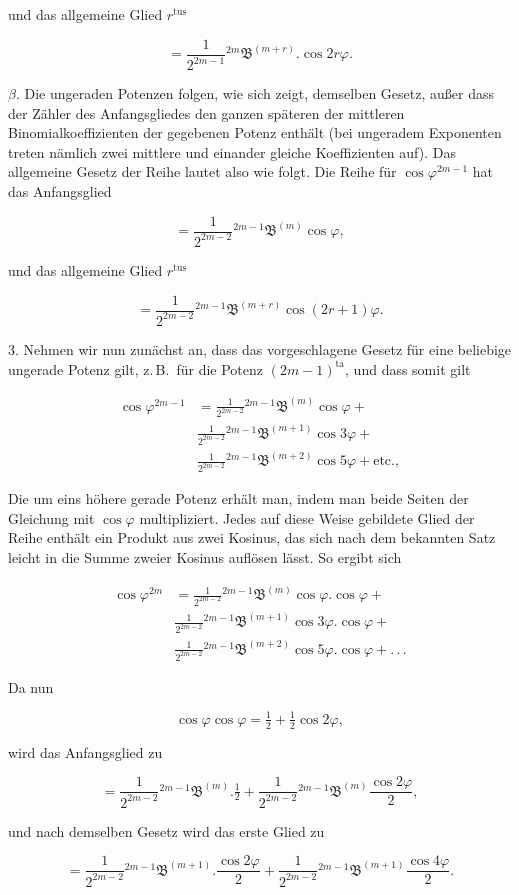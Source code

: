 \par\noindent{}%
und das allgemeine Glied $r^{\text{tus}}$

\[ = \frac{1}{2^{2m-1}}{}^{2m}\!\mathfrak{B}^{(m+r)}\! . \cos 2r\varphi. \]

$\beta$. Die ungeraden Potenzen folgen, wie sich zeigt, demselben Gesetz, außer dass
\noindent der Zähler des Anfangsgliedes den ganzen späteren der mittleren Binomialkoeffizienten der gegebenen Potenz enthält (bei ungeradem Exponenten treten nämlich zwei mittlere und einander gleiche Koeffizienten auf). Das allgemeine Gesetz der Reihe lautet also wie folgt. Die Reihe für $\cos\varphi^{2m-1}$ hat das
\noindent Anfangsglied

\[ = \frac{1}{2^{2m-2}}{}^{2m-1}\!\mathfrak{B}^{(m)}\cos\varphi, \]

\noindent und das allgemeine Glied $r^{\text{tus}}$

\[ = \frac{1}{2^{2m-2}}{}^{2m-1}\!\mathfrak{B}^{(m+r)}\cos(2r+1)\varphi. \]

3. Nehmen wir nun zunächst an, dass das vorgeschlagene Gesetz für eine beliebige ungerade Potenz gilt, z.\,B.\ für die Potenz $(2m-1)^{\text{ta}}$, und dass somit gilt

\[
\begin{aligned}
\cos\varphi^{2m-1} & = \frac{1}{2^{2m-2}}{}^{2m-1}\!\mathfrak{B}^{(m)}\cos\varphi +\\
&{} \frac{1}{2^{2m-2}}{}^{2m-1}\!\mathfrak{B}^{(m+1)}\cos 3\varphi +\\
&{} \frac{1}{2^{2m-2}}{}^{2m-1}\!\mathfrak{B}^{(m+2)}\cos 5\varphi + \text{etc.},
\end{aligned}
\]

\noindent Die um eins höhere gerade Potenz erhält man, indem man beide Seiten der Gleichung mit $\cos\varphi$ multipliziert. Jedes auf diese Weise gebildete Glied der Reihe enthält ein Produkt aus zwei Kosinus, das sich nach dem bekannten Satz leicht in die Summe zweier Kosinus auflösen lässt. So ergibt sich

\[
\begin{aligned}
\cos\varphi^{2m} & = \frac{1}{2^{2m-2}}{}^{2m-1}\!\mathfrak{B}^{(m)}\cos\varphi . \cos\varphi +\\
&{} \frac{1}{2^{2m-2}}{}^{2m-1}\!\mathfrak{B}^{(m+1)}\cos 3\varphi . \cos\varphi +\\
&{} \frac{1}{2^{2m-2}}{}^{2m-1}\!\mathfrak{B}^{(m+2)}\cos 5\varphi . \cos\varphi + .\,.\,.
\end{aligned}
\]

\noindent Da nun

\[ \cos\varphi\cos\varphi = \tfrac12+\tfrac12\cos 2\varphi, \]

\noindent wird das Anfangsglied zu

\[ = \frac{1}{2^{2m-2}}{}^{2m-1}\!\mathfrak{B}^{(m)} . \tfrac12 +
\frac{1}{2^{2m-2}}{}^{2m-1}\!\mathfrak{B}^{(m)}\frac{\cos 2\varphi}{2}, \]

\noindent und nach demselben Gesetz wird das erste Glied zu

\[ = \frac{1}{2^{2m-2}}{}^{2m-1}\!\mathfrak{B}^{(m+1)} . \frac{\cos 2\varphi}{2} +
\frac{1}{2^{2m-2}}{}^{2m-1}\!\mathfrak{B}^{(m+1)}\frac{\cos 4\varphi}{2}. \]
